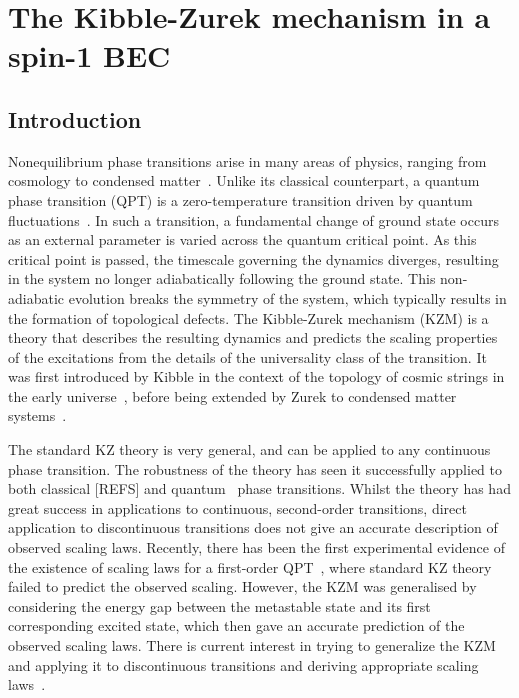 \chapter{The Kibble-Zurek mechanism in a spin-1 BEC}


\section{Introduction}
Nonequilibrium phase transitions arise in many areas of physics, ranging from
cosmology to condensed matter~\cite{Polkovnikov2011}.
Unlike its classical counterpart, a quantum phase transition (QPT) is a
zero-temperature transition driven by quantum fluctuations~\cite{Sachdev2011}.
In such a transition, a fundamental change of ground state occurs as an external
parameter is varied across the quantum critical point.
As this critical point is passed, the timescale governing the dynamics diverges,
resulting in the system no longer adiabatically following the ground state.
This non-adiabatic evolution breaks the symmetry of the system, which typically
results in the formation of topological defects.
The Kibble-Zurek mechanism (KZM) is a theory that describes the resulting
dynamics and predicts the scaling properties of the excitations from the details
of the universality class of the transition.
It was first introduced by Kibble in the context of the topology of cosmic
strings in the early universe~\cite{Kibble1976, Kibble1980}, before being
extended by Zurek to condensed matter systems~\cite{Zurek1985, Zurek1993,
Zurek1996}.


The standard KZ theory is very general, and can be applied to any continuous
phase transition.
The robustness of the theory has seen it successfully applied to both classical
[REFS] and quantum~\cite{Dziarmaga2005, Damski2005, Lamacraft2007} phase
transitions.
Whilst the theory has had great success in applications to continuous,
second-order transitions, direct application to discontinuous transitions
does not give an accurate description of observed scaling laws.
Recently, there has been the first experimental evidence of the existence of
scaling laws for a first-order QPT~\cite{Qiu2020}, where standard KZ theory
failed to predict the observed scaling.
However, the KZM was generalised by considering the energy gap between the
metastable state and its first corresponding excited state, which then gave an
accurate prediction of the observed scaling laws.
There is current interest in trying to generalize the KZM and applying it to
discontinuous transitions and deriving appropriate scaling
laws~\cite{Divakaran2008, Suzuki2015}.


